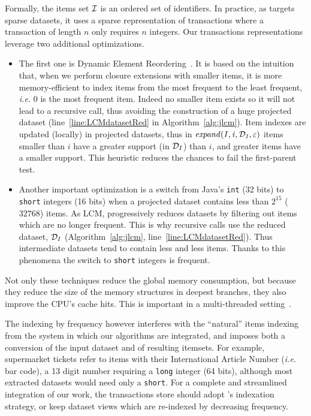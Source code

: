 Formally, the items set ${\cal I}$ is an ordered set of identifiers.
In practice, as \jlcm targets sparse datasets,
it uses a sparse representation of transactions
where a transaction of length $n$ only requires $n$ integers.
Our transactions representations leverage two additional optimizations.

\begin{itemize}
	\item The first one is Dynamic Element Reordering~\cite{ZakiSDM2002}.
	It is based on the intuition that, when we perform closure extensions with smaller items,
	it is more memory-efficient to index items from the most frequent to the least frequent,
	\textit{i.e.} 0 is the most frequent item.
	Indeed no smaller item exists so it will not lead to a recursive call,
	thus avoiding the construction of a huge projected dataset (line~\ref{line:LCMdatasetRed} in Algorithm~\ref{alg:jlcm}).
	Item indexes are updated (locally) in projected datasets,
	thus in $\mathit{expand(I,i,{\cal D}_I,\varepsilon)}$
	items smaller than $i$ have a greater support (in ${\cal D}_I$) than $i$,
	and greater items have a smaller support.
	This heuristic reduces the chances to fail the first-parent test.

	\item Another important optimization is a switch from Java's \verb|int| (32 bits)
	to \verb|short| integers (16 bits) when a projected dataset contains less than $2^{15}$ ($\num{32768}$) items.
	As LCM, \jlcm progressively reduces datasets by filtering out items which are no longer frequent.
	This is why recursive calls use the reduced dataset, ${\cal D}_I$ (Algorithm~\ref{alg:jlcm}, line~\ref{line:LCMdatasetRed}).
	Thus intermediate datasets tend to contain less and less items.
	Thanks to this phenomena the switch to \verb|short| integers is frequent.
\end{itemize}

Not only these techniques reduce the global memory consumption,
but because they reduce the size of the memory structures in deepest branches,
they also improve the CPU's cache hits.
This is important in a multi-threaded setting~\cite{NegrevergneHPCS10}.

The indexing by frequency however interferes with the ``natural'' items indexing
from the system in which our algorithms are integrated,
and imposes both a conversion of the input dataset and of resulting itemsets. %
For example, supermarket tickets refer to items with their International Article Number ({\em i.e.} bar code),
a 13 digit number requiring a \verb|long| integer (64 bits),
although most extracted datasets would need only a \verb|short|.
For a complete and streamlined integration of our work,
the transactions store should adopt \jlcm's indexation strategy,
or keep dataset views which are re-indexed by decreasing frequency.




